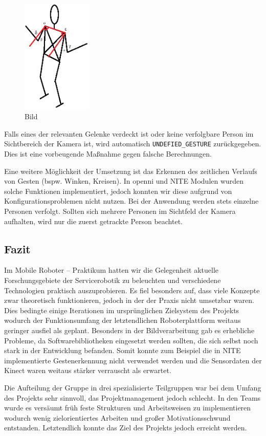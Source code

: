 \begin{figure}
	\centering
	\includegraphics[width=0.3\textwidth]{graphics/BILD-Winkel.png}
	\caption{Bild}
	\label{fig:gestenerkennung_umsetzung_winkel}
\end{figure}

Falls eines der relevanten Gelenke verdeckt ist oder keine verfolgbare Person im
Sichtbereich der Kamera ist, wird automatisch \lstinline{UNDEFIED_GESTURE}
zurückgegeben. Dies ist eine vorbeugende Maßnahme gegen falsche Berechnungen.

Eine weitere Möglichkeit der Umsetzung ist das Erkennen des zeitlichen Verlaufs von Gesten (bspw. Winken, Kreisen).
 In \gls{openni} und NITE Modulen wurden solche Funktionen implementiert, jedoch konnten wir diese aufgrund von Konfigurationsproblemen nicht nutzen.
Bei der Anwendung werden stets einzelne Personen verfolgt. Sollten sich mehrere Personen im Sichtfeld der Kamera aufhalten, wird nur die zuerst getrackte Person beachtet.

\subsection{Fazit}
Im Mobile Roboter -- Praktikum hatten wir die Gelegenheit aktuelle
 Forschungsgebiete der Servicerobotik zu beleuchten und verschiedene
 Technologien praktisch auszuprobieren. Es fiel besonders auf, dass viele Konzepte zwar theoretisch funktionieren,
 jedoch in der der Praxis nicht umsetzbar waren. Dies bedingte einige Iterationen im ursprünglichen Zielsystem des Projekts
 wodurch der Funktionsumfang der letztendlichen Roboterplattform weitaus geringer ausfiel als geplant.
 Besonders in der Bildverarbeitung gab es erhebliche Probleme, da Softwarebibliotheken eingesetzt werden sollten,
 die sich selbst noch stark in der Entwicklung befanden. Somit konnte zum Beispiel die in NITE implementierte Gestenerkennung
 nicht verwendet werden und die Sensordaten der Kinect waren weitaus stärker verrauscht als erwartet.
 
Die Aufteilung der Gruppe in drei spezialisierte Teilgruppen war bei dem Umfang des Projekts sehr sinnvoll,
 das Projektmanagement jedoch schlecht. In den Teams wurde es versäumt früh feste Strukturen und Arbeitsweisen zu implementieren wodurch
 wenig zielorientiertes Arbeiten und großer Motivationsschwund entstanden. Letztendlich konnte das Ziel des Projekts jedoch erreicht werden.
